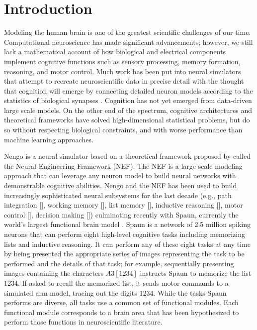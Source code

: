\documentclass{frontiersSCNS}
\begin{document}
\section{Introduction}

Modeling the human brain
is one of the greatest
scientific challenges of our time.
Computational neuroscience
has made significant advancements;
however, we still lack a mathematical account of
how biological and electrical components
implement cognitive functions such as sensory processing,
memory formation, reasoning, and motor control.
Much work has been put into neural simulators
that attempt to recreate neuroscientific
data in precise detail with the thought that
cognition will emerge by connecting
detailed neuron models according
to the statistics of biological synapses \citep{markram2006}.
Cognition has not yet emerged
from data-driven large scale models.
On the other end of the spectrum,
cognitive architectures \citep{anderson2004}
and theoretical frameworks \citep{hawkins2006}
have solved high-dimensional statistical problems,
but do so without respecting biological constraints,
and with worse performance than machine learning approaches.

Nengo is a neural simulator
based on a theoretical framework proposed
by \citet{eliasmith2003}
called the Neural Engineering Framework
(NEF).
The NEF is a large-scale modeling approach
that can leverage any neuron model
to build neural networks with
demonstrable cognitive abilities.
Nengo and the NEF has been used to build
increasingly sophisticated neural subsystems
for the last decade
(e.g., path integration [\citealp{conklin2005}],
working memory [\citealp{singh2006}],
list memory [\citealp{choo2010}],
inductive reasoning [\citealp{rasmussen2011}],
motor control [\citealp{dewolf2011}],
decision making [\citealp{stewart2012}])
culminating recently with Spaun,
currently the world's
largest functional brain model \citep{eliasmith2012}.
Spaun is a network of 2.5 million spiking neurons
that can perform eight high-level cognitive tasks
including memorizing lists and inductive reasoning.
It can perform any of these eight tasks
at any time by being presented
the appropriate series of images
representing the task to be performed
and the details of that task;
for example, sequentially presenting images
containing the characters $A3[1234]$ instructs Spaun
to memorize the list $1234$.
If asked to recall the memorized list,
it sends motor commands to a simulated arm model,
tracing out the digits $1234$.
While the tasks Spaun performs are diverse,
all tasks use a common set of
functional modules.
Each functional module corresponds
to a brain area that has been hypothesized
to perform those functions
in neuroscientific literature.
\end{document}
